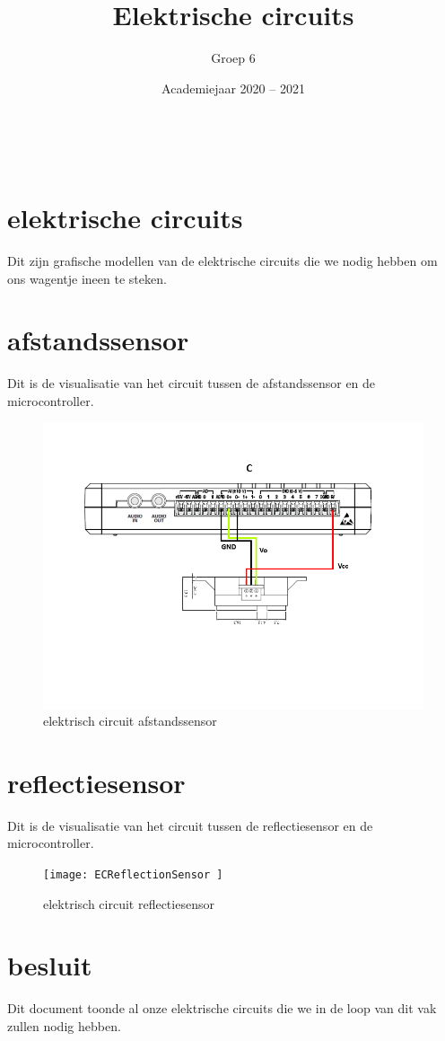 \documentclass[a4paper,kulak]{kulakarticle} %
\date{Academiejaar 2020 -- 2021}
\title{Elektrische circuits}
\author{Groep 6}
\begin{document}
\maketitle
\\
\section*{elektrische circuits}
Dit zijn grafische modellen van de elektrische circuits die we nodig hebben om ons wagentje ineen te steken. 
\section{afstandssensor}
Dit is de visualisatie van het circuit tussen de afstandssensor en de microcontroller.
	\begin{figure}[h]
		\centering
		\includegraphics[width=.5\textwidth]{ECdistanceSensor} 
		\caption{elektrisch circuit afstandssensor}
		\label{fig:afstandssensor}
	\end{figure}

\section{reflectiesensor}
Dit is de visualisatie van het circuit tussen de reflectiesensor en de microcontroller.  
	\begin{figure}[h]
		\centering
		\texttt{[image: ECReflectionSensor ]} 
		\caption{elektrisch circuit reflectiesensor}
		\label{fig:reflectiesensor}
	\end{figure}
\section*{besluit}
Dit document toonde al onze elektrische circuits die we in de loop van dit vak zullen nodig hebben.  
\clearpage
\end{document}
